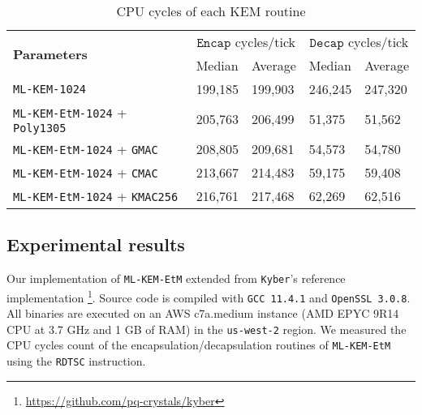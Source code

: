 \documentclass[runningheads]{llncs}
\newcommand{\keygen}{\texttt{KeyGen}}
\newcommand{\encap}{\texttt{Encap}}
\newcommand{\decap}{\texttt{Decap}}
\newcommand{\pk}{\texttt{pk}}
\newcommand{\sk}{\texttt{sk}}
\begin{document}
\begin{table}[h]
    \begin{tabular}[t]{|p{15em}|p{5em}|p{5em}|p{5em}|p{5em}|}
        \hline
        \multirow{2}{*}{\bf Parameters} 
        & \multicolumn{2}{|c|}{$\encap$ cycles/tick} 
        & \multicolumn{2}{|c|}{$\decap$ cycles/tick} \\
        \cline{2-5}
        & Median & Average & Median & Average \\
        \hline
        \texttt{ML-KEM-1024} & 199,185 & 199,903 & 246,245 & 247,320 \\
        \hline
        \texttt{ML-KEM-EtM-1024} + \texttt{Poly1305} & 205,763 & 206,499 & 51,375 & 51,562 \\
        \hline
        \texttt{ML-KEM-EtM-1024} + \texttt{GMAC} & 208,805 & 209,681 & 54,573 & 54,780 \\
        \hline
        \texttt{ML-KEM-EtM-1024} + \texttt{CMAC} & 213,667 & 214,483 & 59,175 & 59,408 \\
        \hline
        \texttt{ML-KEM-EtM-1024} + \texttt{KMAC256} & 216,761 & 217,468 & 62,269 & 62,516 \\
        \hline
    \end{tabular}\vspace{0.8em}
    
    \caption{CPU cycles of each KEM routine}\label{tbl:kem-performance}
\end{table}


\subsection{Experimental results}
Our implementation of \texttt{ML-KEM-EtM} extended from \texttt{Kyber}'s reference implementation \footnote{\url{https://github.com/pq-crystals/kyber}}. Source code is compiled with \texttt{GCC 11.4.1} and \texttt{OpenSSL 3.0.8}. All binaries are executed on an AWS c7a.medium instance (AMD EPYC 9R14 CPU at 3.7 GHz and 1 GB of RAM) in the \texttt{us-west-2} region. We measured the CPU cycles count of the encapsulation/decapsulation routines of \texttt{ML-KEM-EtM} using the \texttt{RDTSC} instruction. 
\end{document}
